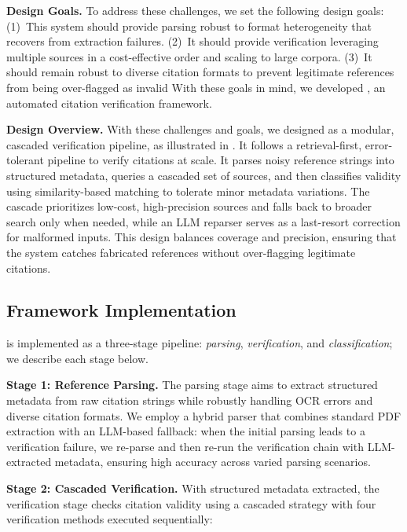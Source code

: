 \noindent
\textbf{Design Goals.}
To address these challenges, we set the following design goals: (1)~This system should provide parsing robust to format heterogeneity that recovers from extraction failures. (2)~It should provide verification leveraging multiple sources in a cost-effective order and scaling to large corpora. (3)~It should remain robust to diverse citation formats to prevent legitimate references from being over-flagged as invalid
With these goals in mind, we developed \citeb, an automated citation verification framework.

\noindent
\textbf{Design Overview.}
With these challenges and goals, we designed \citeb as a modular, cascaded verification pipeline, as illustrated in .
It follows a retrieval-first, error-tolerant pipeline to verify citations at scale. It parses noisy reference strings into structured metadata, queries a cascaded set of sources, and then classifies validity using similarity-based matching to tolerate minor metadata variations. 
The cascade prioritizes low-cost, high-precision sources and falls back to broader search only when needed, while an LLM reparser serves as a last-resort correction for malformed inputs. 
This design balances coverage and precision, ensuring that the system catches fabricated references without over-flagging legitimate citations.

\subsection{Framework Implementation}
\label{subsec:framework_impl}

\citeb is implemented as a three-stage pipeline: \textit{parsing}, \textit{verification}, and \textit{classification}; we describe each stage below.

\noindent
\textbf{Stage 1: Reference Parsing.}
The parsing stage aims to extract structured metadata from raw citation strings while robustly handling OCR errors and diverse citation formats.
We employ a hybrid parser that combines standard PDF extraction with an LLM-based fallback: when the initial parsing leads to a verification failure, we re-parse and then re-run the verification chain with LLM-extracted metadata, ensuring high accuracy across varied parsing scenarios.

\noindent\textbf{Stage 2: Cascaded Verification.}
With structured metadata extracted, the verification stage checks citation validity using a cascaded strategy with four verification methods executed sequentially:

